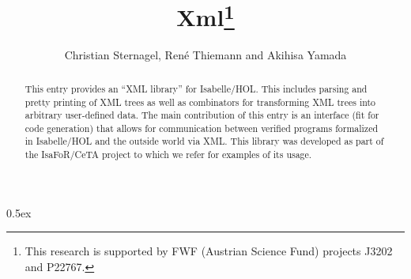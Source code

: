 \documentclass[11pt,a4paper]{article}
\begin{document}
\title{Xml\thanks{This research is supported by FWF (Austrian Science Fund) projects J3202 and P22767.}}
\author{Christian Sternagel, Ren\'e Thiemann and Akihisa Yamada}
\maketitle

\begin{abstract}
This entry provides an ``XML library'' for Isabelle/HOL. This includes parsing
and pretty printing of XML trees as well as combinators for transforming XML
trees into arbitrary user-defined data. The main contribution of this entry is
an interface (fit for code generation) that allows for communication between
verified programs formalized in Isabelle/HOL and the outside world via XML. This
library was developed as part of the IsaFoR/CeTA project to which we refer for
examples of its usage. 
\end{abstract}

\tableofcontents

\parindent 0pt\parskip 0.5ex


\end{document}
